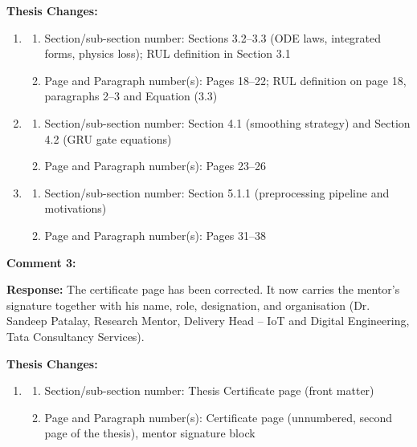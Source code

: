 \documentclass[12pt,a4paper]{article}
\begin{document}
\vspace{\baselineskip}

\textbf{Thesis Changes:}

\begin{enumerate}
    \item
    \begin{enumerate}
        \item Section/sub-section number: Sections 3.2--3.3 (ODE laws, integrated forms, physics loss); RUL definition in Section 3.1
        \item Page and Paragraph number(s): Pages 18--22; RUL definition on page 18, paragraphs 2--3 and Equation (3.3)
    \end{enumerate}
    \item
    \begin{enumerate}
        \item Section/sub-section number: Section 4.1 (smoothing strategy) and Section 4.2 (GRU gate equations)
        \item Page and Paragraph number(s): Pages 23--26
    \end{enumerate}
    \item
    \begin{enumerate}
        \item Section/sub-section number: Section 5.1.1 (preprocessing pipeline and motivations)
        \item Page and Paragraph number(s): Pages 31--38
    \end{enumerate}
\end{enumerate}

\vspace{\baselineskip}

\textbf{Comment 3:} 

\vspace{\baselineskip}

\textbf{Response:} The certificate page has been corrected. It now carries the
mentor's signature together with his name, role, designation, and organisation
(Dr. Sandeep Patalay, Research Mentor, Delivery Head -- IoT and Digital
Engineering, Tata Consultancy Services).

\vspace{\baselineskip}

\textbf{Thesis Changes:}

\begin{enumerate}
    \item
    \begin{enumerate}
        \item Section/sub-section number: Thesis Certificate page (front matter)
        \item Page and Paragraph number(s): Certificate page (unnumbered, second page of the thesis), mentor signature block
    \end{enumerate}
\end{enumerate}
\end{document}
